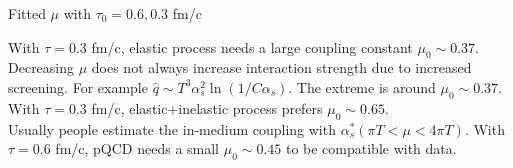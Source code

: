 \documentclass[11pt]{beamer}
\begin{document}
\begin{frame}{Fitted $\mu$ with $\tau_0 = 0.6, 0.3$ fm/c}
\begin{overprint}
With $\tau = 0.3$ fm/c, elastic process needs a large coupling constant $\mu_0 \sim 0.37$. Decreasing $\mu$ does not always increase interaction strength due to increased screening. For example $\hat{q} \sim T^3 \alpha_s^2 \ln(1/C\alpha_s)$. The extreme is around $\mu_0 \sim 0.37$.
With $\tau = 0.3$ fm/c, elastic+inelastic process prefers $\mu_0 \sim 0.65$. \\
Usually people estimate the in-medium coupling with $\alpha_s^*(\pi T <\mu<4\pi T)$.
With $\tau = 0.6$ fm/c, pQCD needs a small $\mu_0 \sim 0.45$ to be compatible with data.
\end{overprint}


\end{frame}
\end{document}

